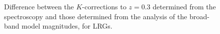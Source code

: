 \clearpage
{}
\begin{figure}
\figurenum{\fignum}
\caption{\label{k_speck_plot.0.3} Difference between the
$K$-corrections to $z=0.3$ determined from the spectroscopy and those
determined from the analysis of the broad-band model magnitudes, for
LRGs.}
\end{figure}
